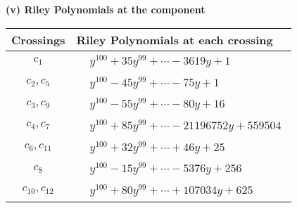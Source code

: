 \documentclass[1p]{elsarticle_modified}
\theoremstyle{definition}
\begin{document}
\newpage\renewcommand{\arraystretch}{1}
\flushleft \textbf{(v) Riley Polynomials at the component}\newline \\
\begin{tabular}{m{50pt}|m{274pt}}
Crossings & \hspace{64pt}Riley Polynomials at each crossing \\
\hline $$\begin{aligned}c_{1}\end{aligned}$$&$\begin{aligned}
&y^{100}+35 y^{99}+\cdots-3619 y+1
\end{aligned}$\\
\hline $$\begin{aligned}c_{2},c_{5}\end{aligned}$$&$\begin{aligned}
&y^{100}-45 y^{99}+\cdots-75 y+1
\end{aligned}$\\
\hline $$\begin{aligned}c_{3},c_{9}\end{aligned}$$&$\begin{aligned}
&y^{100}-55 y^{99}+\cdots-80 y+16
\end{aligned}$\\
\hline $$\begin{aligned}c_{4},c_{7}\end{aligned}$$&$\begin{aligned}
&y^{100}+85 y^{99}+\cdots-21196752 y+559504
\end{aligned}$\\
\hline $$\begin{aligned}c_{6},c_{11}\end{aligned}$$&$\begin{aligned}
&y^{100}+32 y^{99}+\cdots+46 y+25
\end{aligned}$\\
\hline $$\begin{aligned}c_{8}\end{aligned}$$&$\begin{aligned}
&y^{100}-15 y^{99}+\cdots-5376 y+256
\end{aligned}$\\
\hline $$\begin{aligned}c_{10},c_{12}\end{aligned}$$&$\begin{aligned}
&y^{100}+80 y^{99}+\cdots+107034 y+625
\end{aligned}$\\
\hline
\end{tabular}\\~\\
\end{document}
